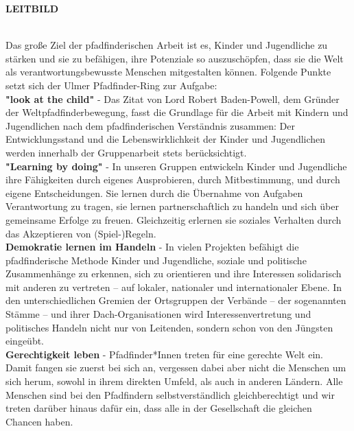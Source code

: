 \begin{Large}
    \textbf{LEITBILD}
\end{Large}
\\

Das große Ziel der pfadfinderischen Arbeit ist es, Kinder und Jugendliche zu stärken und sie zu 
befähigen, ihre Potenziale so auszuschöpfen, dass sie die Welt als verantwortungsbewusste Menschen 
mitgestalten können. Folgende Punkte setzt sich der Ulmer Pfadfinder-Ring zur Aufgabe:
\\

\textbf{"look at the child"} - Das Zitat von Lord Robert Baden-Powell, dem Gründer der 
Weltpfadfinderbewegung, fasst die Grundlage für die Arbeit mit Kindern und Jugendlichen nach dem 
pfadfinderischen Verständnis zusammen: Der Entwicklungsstand und die Lebenswirklichkeit der Kinder 
und Jugendlichen werden innerhalb der Gruppenarbeit stets berücksichtigt. 
\\

\textbf{"Learning by doing"} - In unseren Gruppen entwickeln Kinder und Jugendliche ihre Fähigkeiten 
durch eigenes Ausprobieren, durch Mitbestimmung, und durch eigene Entscheidungen. Sie lernen durch 
die Übernahme von Aufgaben Verantwortung zu tragen, sie lernen partnerschaftlich zu handeln und 
sich über gemeinsame Erfolge zu freuen. Gleichzeitig erlernen sie soziales Verhalten durch das 
Akzeptieren von (Spiel-)Regeln.
\\

\textbf{Demokratie lernen im Handeln} - In vielen Projekten befähigt die pfadfinderische Methode 
Kinder und Jugendliche, soziale und politische Zusammenhänge zu erkennen, sich zu orientieren und 
ihre Interessen solidarisch mit anderen zu vertreten – auf lokaler, nationaler und internationaler 
Ebene. In den unterschiedlichen Gremien der Ortsgruppen der Verbände – der sogenannten Stämme – und 
ihrer Dach-Organisationen wird Interessenvertretung und politisches Handeln nicht nur von 
Leitenden, sondern schon von den Jüngsten eingeübt.
\\

\textbf{Gerechtigkeit leben} - Pfadfinder*Innen treten für eine gerechte Welt ein. Damit fangen sie 
zuerst bei sich an, vergessen dabei aber nicht die Menschen um sich herum, sowohl in ihrem direkten 
Umfeld, als auch in anderen Ländern. Alle Menschen sind bei den Pfadfindern selbstverständlich 
gleichberechtigt und wir treten darüber hinaus dafür ein, dass alle in der Gesellschaft die 
gleichen Chancen haben.
\\

